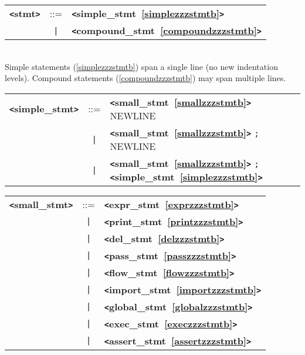 \newlength{\tw}
\newlength{\len}

\label{stmtb}
\begin{tabular}{lcl}
{\bf \verb+<+stmt\verb+>+} & ::=  & {\bf \verb+<+simple\_stmt~\ref{simplezzzstmtb}\verb+>+}  \\
 & \verb+|+  & {\bf \verb+<+compound\_stmt~\ref{compoundzzzstmtb}\verb+>+}  \\
\end{tabular} \\

Simple statements (\ref{simplezzzstmtb}) span a single line (no new indentation levels).  Compound statements (\ref{compoundzzzstmtb}) may span multiple lines. \\

\label{simplezzzstmtb}
\begin{tabular}{lcl}
{\bf \verb+<+simple\_stmt\verb+>+} & ::=  & {\bf \verb+<+small\_stmt~\ref{smallzzzstmtb}\verb+>+}  NEWLINE \\
 & \verb+|+  & {\bf \verb+<+small\_stmt~\ref{smallzzzstmtb}\verb+>+}  \verb|;| NEWLINE \\
 & \verb+|+  & {\bf \verb+<+small\_stmt~\ref{smallzzzstmtb}\verb+>+}  \verb|;| {\bf \verb+<+simple\_stmt~\ref{simplezzzstmtb}\verb+>+}  \\
\end{tabular}

\label{smallzzzstmtb}
\begin{tabular}{lcl}
{\bf \verb+<+small\_stmt\verb+>+} & ::=  & {\bf \verb+<+expr\_stmt~\ref{exprzzzstmtb}\verb+>+}  \\
 & \verb+|+  & {\bf \verb+<+print\_stmt~\ref{printzzzstmtb}\verb+>+}  \\
 & \verb+|+  & {\bf \verb+<+del\_stmt~\ref{delzzzstmtb}\verb+>+}  \\
 & \verb+|+  & {\bf \verb+<+pass\_stmt~\ref{passzzzstmtb}\verb+>+}  \\
 & \verb+|+  & {\bf \verb+<+flow\_stmt~\ref{flowzzzstmtb}\verb+>+}  \\
 & \verb+|+  & {\bf \verb+<+import\_stmt~\ref{importzzzstmtb}\verb+>+}  \\
 & \verb+|+  & {\bf \verb+<+global\_stmt~\ref{globalzzzstmtb}\verb+>+}  \\
 & \verb+|+  & {\bf \verb+<+exec\_stmt~\ref{execzzzstmtb}\verb+>+}  \\
 & \verb+|+  & {\bf \verb+<+assert\_stmt~\ref{assertzzzstmtb}\verb+>+}  \\
\end{tabular}

